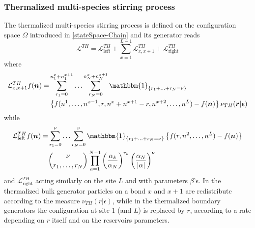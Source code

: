 \documentclass[10pt]{article}
\numberwithin{equation}{section}
\numberwithin{equation}{subsection}
\begin{document}
\subsubsection{Thermalized multi-species stirring process}
The thermalized multi-species stirring process is defined on the configuration space $\Omega$ introduced in \eqref{stateSpace-Chain} and its generator reads
\begin{equation}\label{thermalizedGenerator}
	\mathcal{L}^{TH}=\mathcal{L}_{\text{left}}^{TH}+\sum_{x=1}^{L-1}\mathcal{L}_{x,x+1}^{TH}+\mathcal{L}_{\text{right}}^{TH}
\end{equation}
where 
\begin{equation}\label{bulkThermalized}
	\begin{split}
	\mathcal{L}_{x,x+1}^{TH}f(\bm{n})=&\sum_{r_{1}=0}^{n_{1}^{x}+n_{1}^{x+1}}\ldots\sum_{r_{N}=0}^{n_{N}^{x}+n_{N}^{x+1}}\mathbbm{1}_{\{r_{1}+\ldots+r_{N}=\nu\}}
	\\&
	\left\{f(n^{1},\ldots,n^{x-1},r,n^{x}+n^{x+1}-r,n^{x+2},\ldots,n^{L})-f(\bm{n})\right\}\nu_{TH}(\bm{r}|\bm{\epsilon})
	\end{split}
\end{equation}
while
\begin{equation}\label{boundaryThermalized}
	\begin{split}
		\mathcal{L}_{\text{left}}^{TH}f(\bm{n})=&\sum_{r_{1}=0}^{\nu}\ldots\sum_{r_{N}=0}^{\nu}\mathbbm{1}_{\{r_{1}+\ldots+r_{N}=\nu\}}\left\{f(r,n^{2},\ldots,n^{L})-f(\bm{n})\right\}\\&
		\binom{\nu}{r_{1},\ldots, r_{N}}\prod_{a=1}^{N-1}\left(\frac{\alpha_{k}}{\alpha_{N}}\right)^{r_{k}}\left(\frac{\alpha_{N}}{|\alpha|}\right)^{\nu}
		\end{split}
	\end{equation}
and $\mathcal{L}_{\text{right}}^{TH}$ acting similarly on the site $L$ and with parameters $\beta$'s. 
In the thermalized bulk generator particles on a bond $x$ and $x+1$ are redistribute according to the measure $\nu_{TH}(r|\epsilon)$, while in the thermalized boundary generators the configuration at site $1$ (and $L$) is replaced by $r$, according to a rate depending on $r$ itself and on the reservoirs parameters. 
\end{document}
